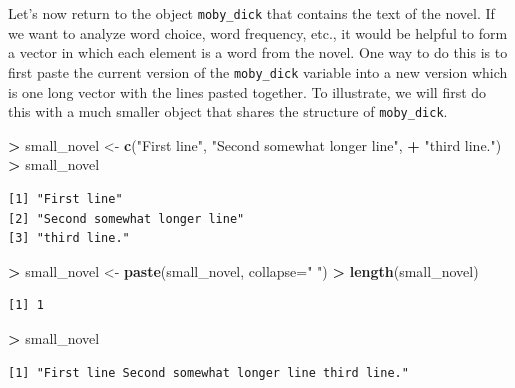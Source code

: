 \documentclass[
]{krantz}
\makeatletter
\newenvironment{Shaded}{\begin{snugshade}}{\end{snugshade}}
\newcommand{\DataTypeTok}[1]{\textcolor[rgb]{0.27,0.27,0.27}{#1}}
\newcommand{\KeywordTok}[1]{\textcolor[rgb]{0.27,0.27,0.27}{\textbf{#1}}}
\newcommand{\NormalTok}[1]{#1}
\newcommand{\OperatorTok}[1]{\textcolor[rgb]{0.43,0.43,0.43}{\textbf{#1}}}
\newcommand{\StringTok}[1]{\textcolor[rgb]{0.5,0.5,0.5}{#1}}
\newenvironment{kframe}{%
\medskip{}
\setlength{\fboxsep}{.8em}
 \def\at@end@of@kframe{}%
 \ifinner\ifhmode%
  \def\at@end@of@kframe{\end{minipage}}%
  \begin{minipage}{\columnwidth}%
 \fi\fi%
 \def\FrameCommand##1{\hskip\@totalleftmargin \hskip-\fboxsep
 \colorbox{shadecolor}{##1}\hskip-\fboxsep
     \hskip-\linewidth \hskip-\@totalleftmargin \hskip\columnwidth}%
 \MakeFramed {\advance\hsize-\width
   \@totalleftmargin\z@ \linewidth\hsize
   \@setminipage}}%
 {\par\unskip\endMakeFramed%
 \at@end@of@kframe}
\renewenvironment{Shaded}{\begin{kframe}}{\end{kframe}}
\makeatother
\begin{document}
Let's now return to the object \texttt{moby\_dick} that contains the text of the novel. If we want to analyze word choice, word frequency, etc., it would be helpful to form a vector in which each element is a word from the novel. One way to do this is to first paste the current version of the \texttt{moby\_dick} variable into a new version which is one long vector with the lines pasted together. To illustrate, we will first do this with a much smaller object that shares the structure of \texttt{moby\_dick}.

\begin{Shaded}
\begin{Highlighting}[]
\OperatorTok{\textgreater{}}\StringTok{ }\NormalTok{small\_novel \textless{}{-}}\StringTok{ }\KeywordTok{c}\NormalTok{(}\StringTok{"First line"}\NormalTok{, }\StringTok{"Second somewhat longer line"}\NormalTok{, }
\OperatorTok{+}\StringTok{                  "third line."}\NormalTok{)}
\OperatorTok{\textgreater{}}\StringTok{ }\NormalTok{small\_novel}
\end{Highlighting}
\end{Shaded}

\begin{verbatim}
[1] "First line"                 
[2] "Second somewhat longer line"
[3] "third line."                
\end{verbatim}

\begin{Shaded}
\begin{Highlighting}[]
\OperatorTok{\textgreater{}}\StringTok{ }\NormalTok{small\_novel \textless{}{-}}\StringTok{ }\KeywordTok{paste}\NormalTok{(small\_novel, }\DataTypeTok{collapse=}\StringTok{" "}\NormalTok{)}
\OperatorTok{\textgreater{}}\StringTok{ }\KeywordTok{length}\NormalTok{(small\_novel)}
\end{Highlighting}
\end{Shaded}

\begin{verbatim}
[1] 1
\end{verbatim}

\begin{Shaded}
\begin{Highlighting}[]
\OperatorTok{\textgreater{}}\StringTok{ }\NormalTok{small\_novel}
\end{Highlighting}
\end{Shaded}

\begin{verbatim}
[1] "First line Second somewhat longer line third line."
\end{verbatim}
\end{document}
